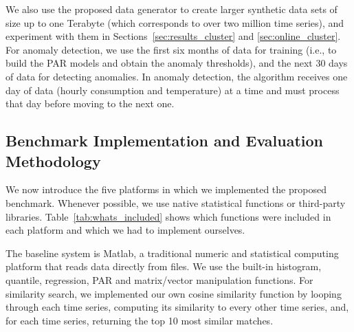 \documentclass[prodmode,acmtods]{acmsmall}
\begin{document}
We also use the proposed data generator to create larger synthetic data sets of size up to one Terabyte (which corresponds to over two million time series), and experiment with them in Sections~\ref{sec:results_cluster} and \ref{sec:online_cluster}.  For anomaly detection, we use the first six months of data for training (i.e., to build the PAR models and obtain the anomaly thresholds), and the next 30 days of data for detecting anomalies.  In anomaly detection, the algorithm receives one day of data (hourly consumption and temperature) at a time and must process that day before moving to the next one.

\subsection{Benchmark Implementation and Evaluation Methodology}  \label{sec:tools}

We now introduce the five platforms in which we implemented the proposed benchmark.  Whenever possible, we use native statistical functions or third-party libraries.  Table~\ref{tab:whats_included} shows which functions were included in each platform and which we had to implement ourselves.

\begin{table}
\end{table}

The baseline system is Matlab, a traditional numeric and statistical computing platform that reads data directly from files.  We use the built-in histogram, quantile, regression, PAR and matrix/vector manipulation functions.  For similarity search, we implemented our own cosine similarity function by looping through each time series, computing its similarity to every other time series, and, for each time series, returning the top 10 most similar matches.
\end{document}
